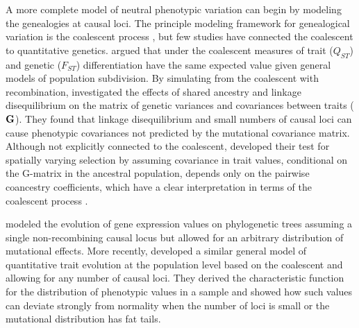 A more complete model of neutral phenotypic variation can begin by modeling the
genealogies at causal loci. The principle modeling framework for genealogical
variation is the coalescent process \citep{Wakeley2008}, but few studies have
connected the coalescent to quantitative genetics. \citet{Whitlock1999} argued
that under the coalescent measures of trait ($Q_{ST}$) and genetic ($F_{ST}$)
differentiation have the same expected value given general models of population
subdivision. By simulating from the coalescent with
recombination, \citet{Griswold2007} investigated the effects of shared ancestry
and linkage disequilibrium on the matrix of genetic variances and covariances
between traits ($\mbox{\textbf{G}}$). They found that linkage disequilibrium and
small numbers of causal loci can cause phenotypic covariances not predicted by
the mutational covariance matrix. Although not explicitly connected to the
coalescent, \citet{Ovaskainen2011} developed their test for spatially varying
selection by assuming covariance in trait values, conditional on the G-matrix in
the ancestral population, depends only on the pairwise coancestry coefficients,
which have a clear interpretation in terms of the coalescent
process \citep{Slatkin1991}.

\citet{Khaitovich2005} modeled the evolution of gene expression values on
phylogenetic trees assuming a single non-recombining causal locus but allowed
for an arbitrary distribution of mutational effects. More
recently, \citet{Schraiber2015} developed a similar general model of
quantitative trait evolution at the population level based on the coalescent and
allowing for any number of causal loci. They derived the characteristic function
for the distribution of phenotypic values in a sample and showed how such values
can deviate strongly from normality when the number of loci is small or the
mutational distribution has fat tails.

